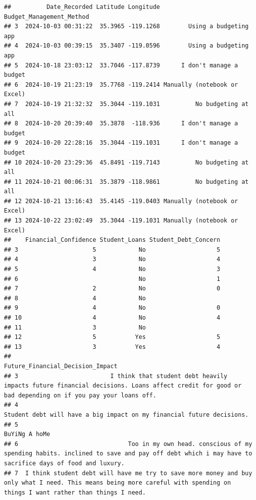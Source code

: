 \documentclass[
]{article}
\begin{document}
\begin{verbatim}
##          Date_Recorded Latitude Longitude     Budget_Management_Method
## 3  2024-10-03 00:31:22  35.3965 -119.1268        Using a budgeting app
## 4  2024-10-03 00:39:15  35.3407 -119.0596        Using a budgeting app
## 5  2024-10-18 23:03:12  33.7046 -117.8739      I don't manage a budget
## 6  2024-10-19 21:23:19  35.7768 -119.2414 Manually (notebook or Excel)
## 7  2024-10-19 21:32:32  35.3044 -119.1031          No budgeting at all
## 8  2024-10-20 20:39:40  35.3878  -118.936      I don't manage a budget
## 9  2024-10-20 22:28:16  35.3044 -119.1031      I don't manage a budget
## 10 2024-10-20 23:29:36  45.8491 -119.7143          No budgeting at all
## 11 2024-10-21 00:06:31  35.3879 -118.9861          No budgeting at all
## 12 2024-10-21 13:16:43  35.4145 -119.0403 Manually (notebook or Excel)
## 13 2024-10-22 23:02:49  35.3044 -119.1031 Manually (notebook or Excel)
##    Financial_Confidence Student_Loans Student_Debt_Concern
## 3                     5            No                    5
## 4                     3            No                    4
## 5                     4            No                    3
## 6                                  No                    1
## 7                     2            No                    0
## 8                     4            No                     
## 9                     4            No                    0
## 10                    4            No                    4
## 11                    3            No                     
## 12                    5           Yes                    5
## 13                    3           Yes                    4
##                                                                                                                                              Future_Financial_Decision_Impact
## 3                          I think that student debt heavily impacts future financial decisions. Loans affect credit for good or bad depending on if you pay your loans off. 
## 4                                                                                                       Student debt will have a big impact on my financial future decisions.
## 5                                                                                                                                                              BuYiNg A hoMe 
## 6                               Too in my own head. conscious of my spending habits. inclined to save and pay off debt which i may have to sacrifice days of food and luxury.
## 7  I think student debt will have me try to save more money and buy only what I need. This means being more careful with spending on things I want rather than things I need.

\end{verbatim}
\end{document}
